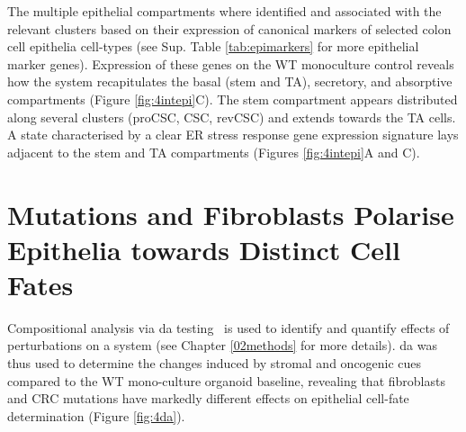 The multiple epithelial compartments where identified and associated with the relevant clusters based on their expression of canonical markers of selected colon cell epithelia cell-types (see Sup. Table \ref{tab:epimarkers} for more epithelial marker genes). Expression of these genes on the WT monoculture control reveals how the system recapitulates the basal (stem and TA), secretory, and absorptive compartments (Figure \ref{fig:4intepi}C). The stem compartment appears distributed along several clusters (proCSC, CSC, revCSC) and extends towards the TA cells. A state characterised by a clear ER stress response gene expression signature lays adjacent to the stem and TA compartments (Figures \ref{fig:4intepi}A and C).

\newpage
\section{Mutations and Fibroblasts Polarise Epithelia towards Distinct Cell Fates}

Compositional analysis via \acrfull{da} testing~\cite{dann_differential_2022} is used to identify and quantify effects of perturbations on a system (see Chapter \ref{02methods} for more details). \acrshort{da} was thus used to determine the changes induced by stromal and oncogenic cues compared to the WT mono-culture organoid baseline, revealing that fibroblasts and CRC mutations have markedly different effects on epithelial cell-fate determination (Figure \ref{fig:4da}). 

